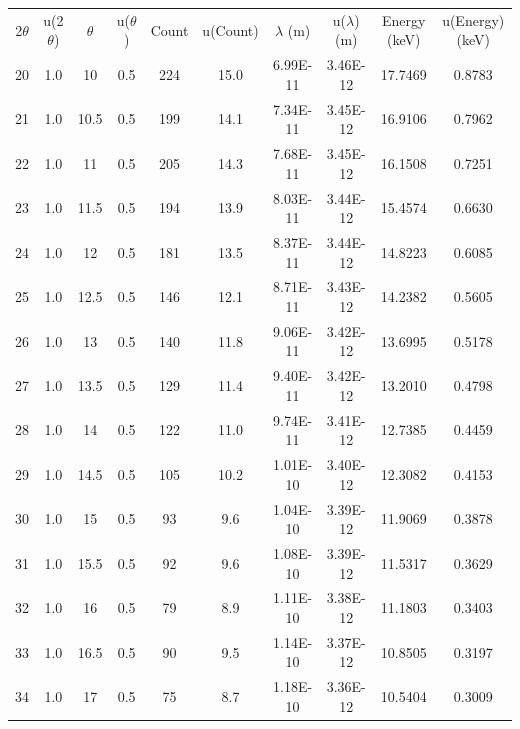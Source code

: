 \begin{maintable}[ht]
\center
\begin{tabular}{cccccccccc}
2$\theta$ & u(2$\theta$) & $\theta$ & u($\theta$) & Count & u(Count) & $\lambda$ (m) & u($\lambda$) (m) & Energy (keV) & u(Energy) (keV) \\
20        & 1.0 & 10       & 0.5         & 224   & 15.0     & 6.99E-11      & 3.46E-12         & 17.7469      & 0.8783 \\
21        & 1.0 & 10.5     & 0.5         & 199   & 14.1     & 7.34E-11      & 3.45E-12         & 16.9106      & 0.7962 \\
22        & 1.0 & 11       & 0.5         & 205   & 14.3     & 7.68E-11      & 3.45E-12         & 16.1508      & 0.7251 \\
23        & 1.0 & 11.5     & 0.5         & 194   & 13.9     & 8.03E-11      & 3.44E-12         & 15.4574      & 0.6630 \\
24        & 1.0 & 12       & 0.5         & 181   & 13.5     & 8.37E-11      & 3.44E-12         & 14.8223      & 0.6085 \\
25        & 1.0 & 12.5     & 0.5         & 146   & 12.1     & 8.71E-11      & 3.43E-12         & 14.2382      & 0.5605 \\
26        & 1.0 & 13       & 0.5         & 140   & 11.8     & 9.06E-11      & 3.42E-12         & 13.6995      & 0.5178 \\
27        & 1.0 & 13.5     & 0.5         & 129   & 11.4     & 9.40E-11      & 3.42E-12         & 13.2010      & 0.4798 \\
28        & 1.0 & 14       & 0.5         & 122   & 11.0     & 9.74E-11      & 3.41E-12         & 12.7385      & 0.4459 \\
29        & 1.0 & 14.5     & 0.5         & 105   & 10.2     & 1.01E-10      & 3.40E-12         & 12.3082      & 0.4153 \\
30        & 1.0 & 15       & 0.5         & 93    & 9.6      & 1.04E-10      & 3.39E-12         & 11.9069      & 0.3878 \\
31        & 1.0 & 15.5     & 0.5         & 92    & 9.6      & 1.08E-10      & 3.39E-12         & 11.5317      & 0.3629 \\
32        & 1.0 & 16       & 0.5         & 79    & 8.9      & 1.11E-10      & 3.38E-12         & 11.1803      & 0.3403 \\
33        & 1.0 & 16.5     & 0.5         & 90    & 9.5      & 1.14E-10      & 3.37E-12         & 10.8505      & 0.3197 \\
34        & 1.0 & 17       & 0.5         & 75    & 8.7      & 1.18E-10      & 3.36E-12         & 10.5404      & 0.3009 \\

\end{tabular}
\end{maintable}
